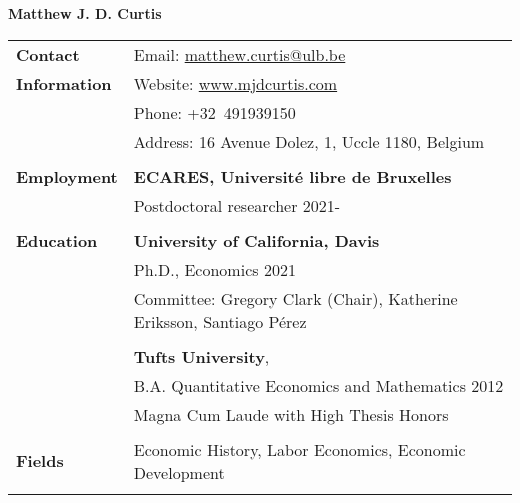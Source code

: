 \documentclass[letterpaper,11pt,oneside]{article}
\begin{document}

\noindent  \LARGE{\textbf{Matthew J. D. Curtis}}  \\

\normalsize




\noindent \begin{longtable}{@{} p{0.15\linewidth} p{0.8\linewidth} p{0.05\linewidth}}


  
 \textbf{\large{Contact}}    &  \multicolumn{2}{l}{Email: \href{mailto:matthew.curtis@ulb.be}{matthew.curtis@ulb.be} }\\
   \textbf{\large{Information}}  &  \multicolumn{2}{l}{Website: \href{https://www.mjdcurtis.com/}{www.mjdcurtis.com} }\\
   &  \multicolumn{2}{l}{Phone: +32~491939150}\\
      &  \multicolumn{2}{l}{Address: 16 Avenue Dolez, 1, Uccle 1180, Belgium}\\
      \\ 

      \textbf{\large{Employment}}    & \multicolumn{2}{l}{\textbf{ECARES, Universit\'{e} libre de Bruxelles }} \\
      &  \multicolumn{2}{l}{ Postdoctoral researcher \hfill  2021-}\\
    \\
 \textbf{\large{Education}}    & \multicolumn{2}{l}{\textbf{University of California, Davis}} \\
     &  \multicolumn{2}{l}{ Ph.D., Economics \hfill  2021}\\
   &   \multicolumn{2}{l}{ Committee: Gregory Clark (Chair), Katherine Eriksson, Santiago P\'{e}rez}\\

   \\
     & \multicolumn{2}{l}{ \textbf{Tufts University},}\\
     & \multicolumn{2}{l}{B.A. Quantitative Economics and Mathematics \hfill  2012}\\
     & \multicolumn{2}{l}{Magna Cum Laude  with High Thesis Honors   }\\
     &  \multicolumn{2}{l}{ }\\
     \textbf{\large{Fields}}    &  \multicolumn{2}{l}{ Economic History,  Labor Economics, Economic Development}\\
     \\


\end{longtable}
\end{document}
